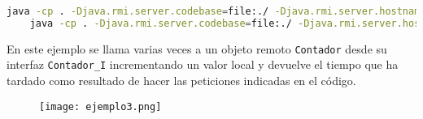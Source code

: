 \begin{lstlisting}[language=sh]
	java -cp . -Djava.rmi.server.codebase=file:./ -Djava.rmi.server.hostname=localhost -Djava.security.policy=server.policy ejemplo3.Servidor
	java -cp . -Djava.rmi.server.codebase=file:./ -Djava.rmi.server.hostname=localhost -Djava.security.policy=server.policy ejemplo3.Cliente
\end{lstlisting}

En este ejemplo se llama varias veces a un objeto remoto \texttt{Contador} desde su interfaz \texttt{Contador\_I}
incrementando un valor local y devuelve el tiempo que ha tardado como resultado de hacer las peticiones indicadas en el código.

\begin{figure}[!ht]
	\begin{center}
		\texttt{[image: ejemplo3.png]}
	\end{center}
\end{figure}
